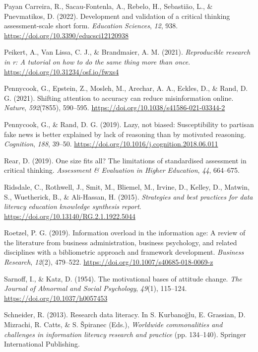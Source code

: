 \documentclass[
  12pt,
  a4paper,
  twoside]{article}
\newlength{\cslhangindent}
\newenvironment{CSLReferences}[2] %
 {\begin{list}{}{%
  \setlength{\itemindent}{0pt}
  \setlength{\leftmargin}{0pt}
  \setlength{\parsep}{0pt}
  \ifodd #1
   \setlength{\leftmargin}{\cslhangindent}
   \setlength{\itemindent}{-1\cslhangindent}
  \fi
  \setlength{\itemsep}{#2\baselineskip}}}
 {\end{list}}
\begin{document}
\begin{CSLReferences}{1}{0}
Payan Carreira, R., Sacau-Fontenla, A., Rebelo, H., Sebastião, L., \& Pnevmatikos, D. (2022). Development and validation of a critical thinking assessment-scale short form. \emph{Education Sciences}, \emph{12}, 938. \url{https://doi.org/10.3390/educsci12120938}

Peikert, A., Van Lissa, C. J., \& Brandmaier, A. M. (2021). \emph{Reproducible research in r: A tutorial on how to do the same thing more than once}. \url{https://doi.org/10.31234/osf.io/fwxs4}

Pennycook, G., Epstein, Z., Mosleh, M., Arechar, A. A., Eckles, D., \& Rand, D. G. (2021). Shifting attention to accuracy can reduce misinformation online. \emph{Nature}, \emph{592}(7855), 590--595. \url{https://doi.org/10.1038/s41586-021-03344-2}

Pennycook, G., \& Rand, D. G. (2019). Lazy, not biased: Susceptibility to partisan fake news is better explained by lack of reasoning than by motivated reasoning. \emph{Cognition}, \emph{188}, 39--50. \url{https://doi.org/10.1016/j.cognition.2018.06.011}

Rear, D. (2019). One size fits all? The limitations of standardised assessment in critical thinking. \emph{Assessment \& Evaluation in Higher Education}, \emph{44}, 664--675.

Ridsdale, C., Rothwell, J., Smit, M., Bliemel, M., Irvine, D., Kelley, D., Matwin, S., Wuetherick, B., \& Ali-Hassan, H. (2015). \emph{Strategies and best practices for data literacy education knowledge synthesis report}. \url{https://doi.org/10.13140/RG.2.1.1922.5044}

Roetzel, P. G. (2019). Information overload in the information age: A review of the literature from business administration, business psychology, and related disciplines with a bibliometric approach and framework development. \emph{Business Research}, \emph{12}(2), 479--522. \url{https://doi.org/10.1007/s40685-018-0069-z}

Sarnoff, I., \& Katz, D. (1954). The motivational bases of attitude change. \emph{The Journal of Abnormal and Social Psychology}, \emph{49}(1), 115--124. \url{https://doi.org/10.1037/h0057453}

Schneider, R. (2013). Research data literacy. In S. Kurbanoğlu, E. Grassian, D. Mizrachi, R. Catts, \& S. Špiranec (Eds.), \emph{Worldwide commonalities and challenges in information literacy research and practice} (pp. 134--140). Springer International Publishing.


\end{CSLReferences}
\end{document}
